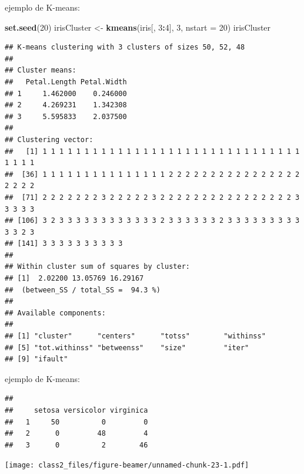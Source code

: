 \documentclass[ignorenonframetext,]{beamer}
\newenvironment{Shaded}{\begin{snugshade}}{\end{snugshade}}
\newcommand{\KeywordTok}[1]{\textcolor[rgb]{0.13,0.29,0.53}{\textbf{#1}}}
\newcommand{\DataTypeTok}[1]{\textcolor[rgb]{0.13,0.29,0.53}{#1}}
\newcommand{\DecValTok}[1]{\textcolor[rgb]{0.00,0.00,0.81}{#1}}
\newcommand{\StringTok}[1]{\textcolor[rgb]{0.31,0.60,0.02}{#1}}
\newcommand{\OperatorTok}[1]{\textcolor[rgb]{0.81,0.36,0.00}{\textbf{#1}}}
\newcommand{\NormalTok}[1]{#1}
\begin{document}
\begin{frame}[fragile]

\begin{block}{ejemplo de K-means:}

\begin{Shaded}
\begin{Highlighting}[]
\KeywordTok{set.seed}\NormalTok{(}\DecValTok{20}\NormalTok{)}
\NormalTok{irisCluster <-}\StringTok{ }\KeywordTok{kmeans}\NormalTok{(iris[, }\DecValTok{3}\OperatorTok{:}\DecValTok{4}\NormalTok{], }\DecValTok{3}\NormalTok{, }\DataTypeTok{nstart =} \DecValTok{20}\NormalTok{)}
\NormalTok{irisCluster}
\end{Highlighting}
\end{Shaded}

\begin{verbatim}
## K-means clustering with 3 clusters of sizes 50, 52, 48
## 
## Cluster means:
##   Petal.Length Petal.Width
## 1     1.462000    0.246000
## 2     4.269231    1.342308
## 3     5.595833    2.037500
## 
## Clustering vector:
##   [1] 1 1 1 1 1 1 1 1 1 1 1 1 1 1 1 1 1 1 1 1 1 1 1 1 1 1 1 1 1 1 1 1 1 1 1
##  [36] 1 1 1 1 1 1 1 1 1 1 1 1 1 1 1 2 2 2 2 2 2 2 2 2 2 2 2 2 2 2 2 2 2 2 2
##  [71] 2 2 2 2 2 2 2 3 2 2 2 2 2 3 2 2 2 2 2 2 2 2 2 2 2 2 2 2 2 2 3 3 3 3 3
## [106] 3 2 3 3 3 3 3 3 3 3 3 3 3 3 2 3 3 3 3 3 3 2 3 3 3 3 3 3 3 3 3 3 3 2 3
## [141] 3 3 3 3 3 3 3 3 3 3
## 
## Within cluster sum of squares by cluster:
## [1]  2.02200 13.05769 16.29167
##  (between_SS / total_SS =  94.3 %)
## 
## Available components:
## 
## [1] "cluster"      "centers"      "totss"        "withinss"    
## [5] "tot.withinss" "betweenss"    "size"         "iter"        
## [9] "ifault"
\end{verbatim}

\end{block}

\end{frame}

\begin{frame}[fragile]

\begin{block}{ejemplo de K-means:}

\begin{verbatim}
##    
##     setosa versicolor virginica
##   1     50          0         0
##   2      0         48         4
##   3      0          2        46
\end{verbatim}

\texttt{[image: class2\_files/figure-beamer/unnamed-chunk-23-1.pdf]}

\end{block}

\end{frame}
\end{document}
